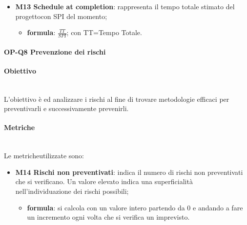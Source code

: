 \begin{itemize}
				\item \textbf{M13 Schedule at completion}: rappresenta il tempo totale stimato del progetto\glosp con SPI del momento;
				\begin{itemize}
					\item[] \textbf{formula}: $\frac{TT}{SPI}$; con TT=Tempo Totale. 
				\end{itemize} 
			\end{itemize}
		
			\paragraph{OP-Q8 Prevenzione dei rischi}
			\paragraph*{Obiettivo}\mbox{}\\ [1mm]
			L'obiettivo è ed analizzare i rischi al fine di trovare metodologie efficaci per preventivarli e successivamente prevenirli.
			\paragraph*{Metriche}\mbox{}\\ [1mm]
			Le metriche\glosp utilizzate sono:
			\begin{itemize}
				\item \textbf{M14 Rischi non preventivati}: indica il numero di rischi non preventivati che si verificano. Un valore elevato indica una superficialità nell'individuazione dei rischi possibili;
				\begin{itemize}
					\item[] \textbf{formula}: si calcola con un valore intero partendo da 0 e andando a fare un incremento ogni volta che si verifica un imprevisto.
				\end{itemize}
			\end{itemize}
